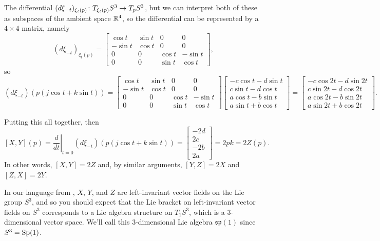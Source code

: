The differential $(d\xi_{-t})_{\xi_t(p)}\colon\thinspace\! T_{\xi_t(p)}S^3 \to T_p S^3$, but we can interpret both of these as subspaces of the ambient space $\mathbb{R}^4$, so the differential can be represented by a $4 \times 4$ matrix, namely
\[
	(d \xi_{-t})_{\xi_t(p)} = \begin{bmatrix} \cos t& \sin t & 0 & 0 \\ -\sin t & \cos t & 0 & 0 \\ 0 & 0 & \cos t & -\sin t \\ 0 & 0 & \sin t & \cos t \end{bmatrix},
\]
so
\[
	(d\xi_{-t})(p(j\cos t + k \sin t)) = \begin{bmatrix} \cos t& \sin t & 0 & 0 \\ -\sin t & \cos t & 0 & 0 \\ 0 & 0 & \cos t & -\sin t \\ 0 & 0 & \sin t & \cos t \end{bmatrix} \begin{bmatrix} -c \cos t - d \sin t \\ c \sin t - d \cos t \\ a \cos t - b \sin t \\ a \sin t + b \cos t \end{bmatrix} = \begin{bmatrix} -c \cos 2t - d \sin 2t \\ c \sin 2t - d \cos 2t \\ a \cos 2t - b \sin 2t \\ a \sin 2t + b \cos 2t \end{bmatrix}.
\]

Putting this all together, then
\[
	[X,Y](p) =\left. \frac{d}{dt}\right|_{t=0} (d\xi_{-t})(p(j\cos t + k \sin t)) = \begin{bmatrix} -2d \\ 2c \\ -2b \\ 2a \end{bmatrix} = 2pk = 2Z(p).
\]
In other words, $[X,Y] = 2Z$ and, by similar arguments, $[Y,Z] = 2X$ and $[Z,X] = 2Y$.

In our language from , $X$, $Y$, and $Z$ are left-invariant vector fields on the Lie group $S^3$, and so you should expect that the Lie bracket on left-invariant vector fields on $S^3$ corresponds to a Lie algebra structure on $T_1 S^3$, which is a 3-dimensional vector space. We'll call this 3-dimensional Lie algebra $\mathfrak{sp}(1)$ since $S^3 = \operatorname{Sp}(1)$. 

